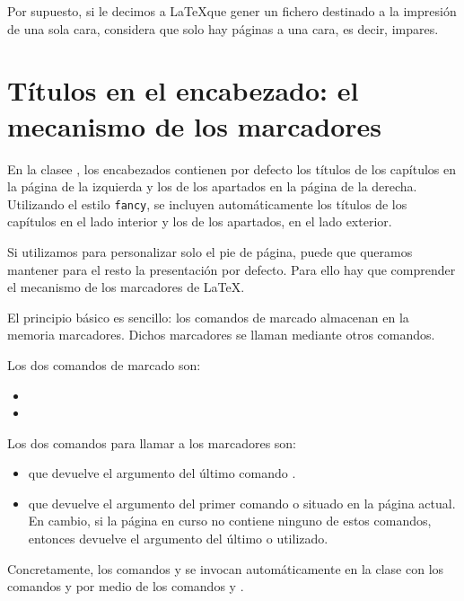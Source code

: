 Por supuesto, si le decimos a \LaTeX que gener un fichero destinado a la impresión de una sola cara, considera que solo hay páginas a una cara, es decir, impares.

\section{Títulos en el encabezado: el mecanismo de los marcadores}

En la clasee , los encabezados contienen por defecto los títulos de los capítulos en la página de la izquierda y los de los apartados en la página de la derecha. Utilizando el estilo \verb|fancy|, se incluyen automáticamente los títulos de los capítulos en el lado interior y los de los apartados, en el lado exterior. 

Si utilizamos  para personalizar solo el pie de página, puede que queramos mantener para el resto la presentación por defecto. Para ello hay que comprender el mecanismo de los marcadores de \LaTeX. 

El principio básico es sencillo: los comandos de marcado almacenan en la memoria marcadores. Dichos marcadores se llaman mediante otros comandos. 

Los dos comandos de marcado son:
\begin{itemize}
\item {}
\item {}
\end{itemize}

Los dos comandos para llamar a los marcadores son: 
\begin{itemize}
\item{} que devuelve el argumento  del último comando .
\item{}  que devuelve el argumento  del primer comando  o   situado en la página actual. En cambio, si la página en curso no contiene ninguno de estos comandos, entonces  devuelve el argumento  del último  o  utilizado.
\end{itemize}

Concretamente, los comandos  y  se invocan automáticamente en la clase  con los comandos  y  por medio de los comandos  y . 

